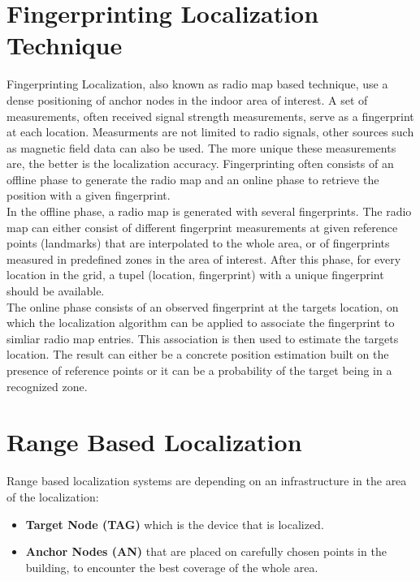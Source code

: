 \section{Fingerprinting Localization Technique}
Fingerprinting Localization, also known as radio map based technique, use a dense positioning of anchor nodes in the indoor area of interest. A set of measurements, often received signal strength measurements, serve as a fingerprint at each location. Measurments are not limited to radio signals, other sources such as magnetic field data can also be used. The more unique these measurements are, the better is the localization accuracy. Fingerprinting often consists of an offline phase to generate the radio map and an online phase to retrieve the position with a given fingerprint.\\
\noindent\hspace*{5mm}%
In the offline phase, a radio map is generated with several fingerprints. The radio map can either consist of different fingerprint measurements at given reference points (landmarks) that are interpolated to the whole area, or of fingerprints measured in predefined zones in the area of interest. After this phase, for every location in the grid, a tupel (location, fingerprint) with a unique fingerprint should be available.\\
\noindent\hspace*{5mm}%
The online phase consists of an observed fingerprint at the targets location, on which the localization algorithm can be applied to associate the fingerprint to simliar radio map entries. This association is then used to estimate the targets location. The result can either be a concrete position estimation built on the presence of reference points or it can be a probability of the target being in a recognized zone. 


\section{Range Based Localization}

Range based localization systems are depending on an infrastructure in the area of the localization:
\begin{itemize} 
\item \textbf{Target Node (TAG)} which is the device that is localized. 
\item \textbf{Anchor Nodes (AN)} that are placed on carefully chosen points in the building, to encounter the best coverage of the whole area.
\end{itemize}

